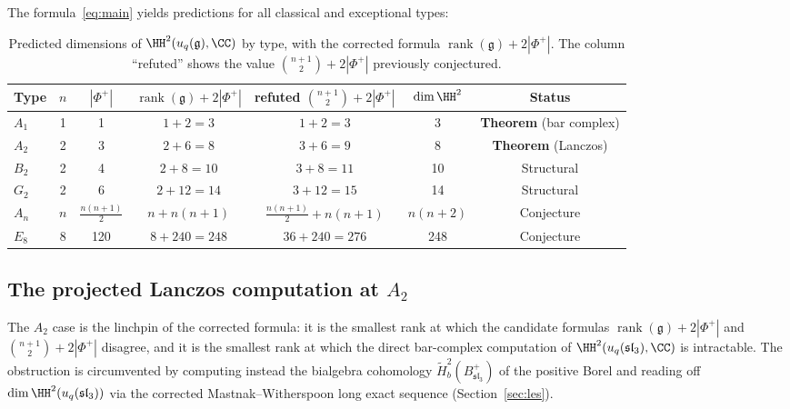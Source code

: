 The formula~\eqref{eq:main} yields predictions for all classical and exceptional types:

\begin{table}[htbp]
\centering
\caption{Predicted dimensions of $\HH^2(u_q(\mathfrak{g}), \CC)$ by type, with the corrected formula $\operatorname{rank}(\mathfrak{g}) + 2|\Phi^+|$. The column ``refuted'' shows the value $\binom{n+1}{2} + 2|\Phi^+|$ previously conjectured.}
\label{tab:predictions}
\begin{tabular}{@{}lcccccc@{}}
\toprule
Type & $n$ & $|\Phi^+|$ & $\operatorname{rank}(\mathfrak{g}) + 2|\Phi^+|$ & refuted $\binom{n+1}{2} + 2|\Phi^+|$ & $\dim \HH^2$ & Status \\
\midrule
$A_1$ & 1 & 1  & $1 + 2 = 3$    & $1 + 2 = 3$    & 3   & \textbf{Theorem} (bar complex) \\
$A_2$ & 2 & 3  & $2 + 6 = 8$    & $3 + 6 = 9$    & 8   & \textbf{Theorem} (Lanczos) \\
$B_2$ & 2 & 4  & $2 + 8 = 10$   & $3 + 8 = 11$   & 10  & Structural \\
$G_2$ & 2 & 6  & $2 + 12 = 14$  & $3 + 12 = 15$  & 14  & Structural \\
$A_n$ & $n$ & $\frac{n(n+1)}{2}$ & $n + n(n+1)$ & $\frac{n(n+1)}{2} + n(n+1)$ & $n(n+2)$ & Conjecture \\
$E_8$ & 8 & 120 & $8 + 240 = 248$ & $36 + 240 = 276$ & 248 & Conjecture \\
\bottomrule
\end{tabular}
\end{table}

\subsection{The projected Lanczos computation at $A_2$}
\label{sec:lanczos}

The $A_2$ case is the linchpin of the corrected formula: it is the smallest rank at which the candidate formulas $\operatorname{rank}(\mathfrak{g}) + 2|\Phi^+|$ and $\binom{n+1}{2} + 2|\Phi^+|$ disagree, and it is the smallest rank at which the direct bar-complex computation of $\HH^2(u_q(\mathfrak{sl}_3), \CC)$ is intractable. The obstruction is circumvented by computing instead the bialgebra cohomology $\tilde{H}^2_b(B^+_{\mathfrak{sl}_3})$ of the positive Borel and reading off $\dim \HH^2(u_q(\mathfrak{sl}_3))$ via the corrected Mastnak--Witherspoon long exact sequence (Section~\ref{sec:les}).

